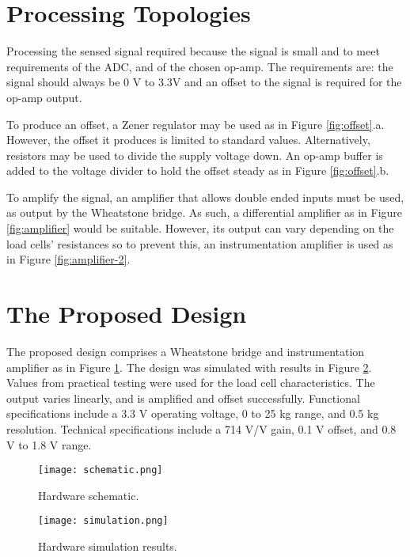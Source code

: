 \section{Processing Topologies}

Processing the sensed signal required because the signal is small and to meet requirements of the ADC, and of the chosen op-amp. The requirements are: the signal should always be 0 V to 3.3V and an offset to the signal is required for the op-amp output.

To produce an offset, a Zener regulator may be used as in Figure \ref{fig:offset}.a. However, the offset it produces is limited to standard values. Alternatively, resistors may be used to divide the supply voltage down. An op-amp buffer is added to the voltage divider to hold the offset steady as in Figure \ref{fig:offset}.b.

To amplify the signal, an amplifier that allows double ended inputs must be used, as output by the Wheatstone bridge. As such, a differential amplifier as in Figure \ref{fig:amplifier} would be suitable. However, its output can vary depending on the load cells' resistances so to prevent this, an instrumentation amplifier is used as in Figure \ref{fig:amplifier-2}.


\section{The Proposed Design}

The proposed design comprises a Wheatstone bridge and instrumentation amplifier as in Figure \ref{fig:schematic}. The design was simulated with results in Figure \ref{fig:simulation}. Values from practical testing were used for the load cell characteristics. The output varies linearly, and is amplified and offset successfully. Functional specifications include a 3.3 V operating voltage, 0 to 25 kg range, and 0.5 kg resolution. Technical specifications include a 714 V/V gain, 0.1 V offset, and 0.8 V to 1.8 V range.


\begin{figure}[!ht]
	\centering
	\texttt{[image: schematic.png]}
	\caption{Hardware schematic.}
	\label{fig:schematic}
\end{figure}

\begin{figure}[!ht]
	\centering
	\texttt{[image: simulation.png]}
	\caption{Hardware simulation results.}
	\label{fig:simulation}
\end{figure}



